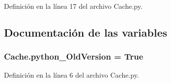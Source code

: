 Definición en la línea 17 del archivo Cache.\-py.



\subsection{Documentación de las variables}
\hypertarget{namespace_cache_aa592a726ef6e7ac4acdafea398c8d708}{
\subsubsection[{python\-\_\-\-Old\-Version}]{\setlength{\rightskip}{0pt plus 5cm}Cache.\-python\-\_\-\-Old\-Version = True}}\label{namespace_cache_aa592a726ef6e7ac4acdafea398c8d708}


Definición en la línea 6 del archivo Cache.\-py.

